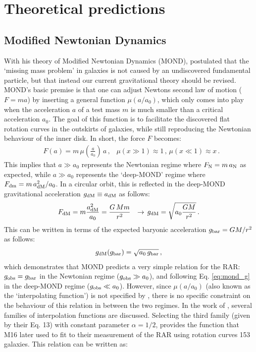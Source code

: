 \documentclass[usenatbib]{mnras}
\newcommand{\un}[1]{_{\rm #1}}
\begin{document}
\section{Theoretical predictions}
\label{sec:theories}

\subsection{Modified Newtonian Dynamics}
\label{sec:MOND}

With his theory of Modified Newtonian Dynamics (MOND), \cite{milgrom1983} postulated that the `missing mass problem' in galaxies is not caused by an undiscovered fundamental particle, but that instead our current gravitational theory should be revised. MOND's basic premise is that one can adjust Newtons second law of motion ($F=ma$) by inserting a general function $\mu(a/a_0)$, which only comes into play when the acceleration $a$ of a test mass $m$ is much smaller than a critical acceleration $a_0$. The goal of this function is to facilitate the discovered flat rotation curves in the outskirts of galaxies, while still reproducing the Newtonian behaviour of the inner disk. In short, the force $F$ becomes:
\begin{align}\label{eq:mond_f}
	& F(a) = m \, \mu(\frac{a}{a_0}) \, a \, ,
	& \mu(x \gg 1) \approx 1 \, , \, \mu(x \ll 1) \approx x \, .
\end{align}
This implies that $a\gg a_0$ represents the Newtonian regime where $F\un{N} = m \, a\un{N}$ as expected, while $a\gg a_0$ represents the `deep-MOND' regime where $F\un{dm}=m \, a\un{dM}^2/a_0$. In a circular orbit, this is reflected in the deep-MOND gravitational acceleration $g\un{dM} \equiv a\un{dM}$ as follows:
\begin{align}\label{eq:mond_g}
	& F\un{dM} = m \frac{a\un{dM}^2}{a_0} = \frac{G \, M m}{r^2}
	& \rightarrow \,  g\un{dM} = \sqrt{a_0 \frac{G M}{r^2}} \, .
\end{align}
This can be written in terms of the expected baryonic acceleration $g\un{bar}=GM/r^2$ as follows:
\begin{equation}
	g\un{dM}(g\un{bar}) = \sqrt{a_0 \, g\un{bar}} \, ,
\end{equation}
which demonstrates that MOND predicts a very simple relation for the RAR: $g\un{obs}=g\un{bar}$ in the Newtonian regime ($g\un{obs}\gg a_0$), and following Eq. \ref{eq:mond_g} in the deep-MOND regime ($g\un{obs}\ll a_0$). However, since $\mu(a/a_0)$ (also known as the `interpolating function') is not specified by \cite{milgrom1983}, there is no specific constraint on the behaviour of this relation in between the two regimes. In the work of \cite{milgrom2008}, several families of interpolation functions are discussed. Selecting the third family (given by their Eq. 13) with constant parameter $\alpha=1/2$, provides the function that M16 later used to fit to their measurement of the RAR using rotation curves 153 galaxies. This relation can be written as:
\end{document}
